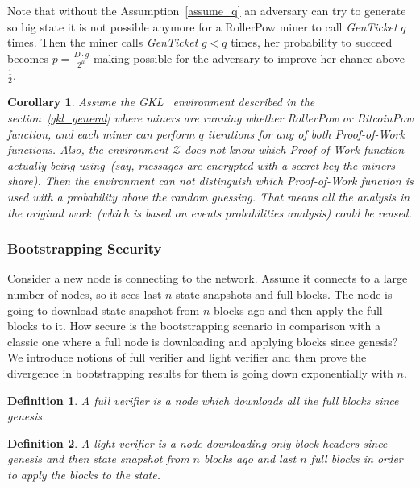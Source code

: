 \documentclass[conference,compsoc]{IEEEtran}
\newtheorem{definition}{Definition}
\newtheorem{corollary}{Corollary}
\begin{document}
Note that without the Assumption~\ref{assume_q} an adversary can try to generate so big state it is not possible anymore for a RollerPow miner to call \textit{GenTicket} \(q\) times. Then the miner calls \textit{GenTicket} \(g < q\) times, her probability to succeed becomes \(p = \frac{D \cdot g}{2^\mu} \) making possible for the adversary to improve her chance above $\frac{1}{2}$.

\begin{corollary}
\label{cor_gkl}
Assume the GKL~\cite{garay2015bitcoin} environment described in the section~\ref{gkl_general} where miners are running whether \textit{RollerPow} or \textit{BitcoinPow} function, and each miner can perform $q$ iterations for any of both Proof-of-Work functions. Also, the environment $\mathcal{Z}$ does not know which Proof-of-Work function actually being using~(say, messages are encrypted with a secret key the miners share). Then the environment can not distinguish which Proof-of-Work function is used with a probability above the random guessing. That means all the analysis in the original work~(which is based on events probabilities analysis) could be reused. 
\end{corollary}



\subsubsection{Bootstrapping Security}

Consider a new node is connecting to the network. Assume it connects to a large number of nodes, so it sees last \(n\) state snapshots and full blocks. The node is going to download state snapshot from \(n\) blocks ago and then apply the full blocks to it. How secure is the bootstrapping scenario in comparison with a classic one where a full node is downloading and applying blocks since genesis? We introduce notions of full verifier and light verifier and then prove the divergence in bootstrapping results for them is going down exponentially with \(n\).

\begin{definition}A full verifier is a node which downloads all the full blocks since genesis. \end{definition}

\begin{definition}A light verifier is a node downloading only block headers since genesis and then state snapshot from \(n\) blocks ago and last \(n\) full blocks in order to apply the blocks to the state. \end{definition}
\end{document}
